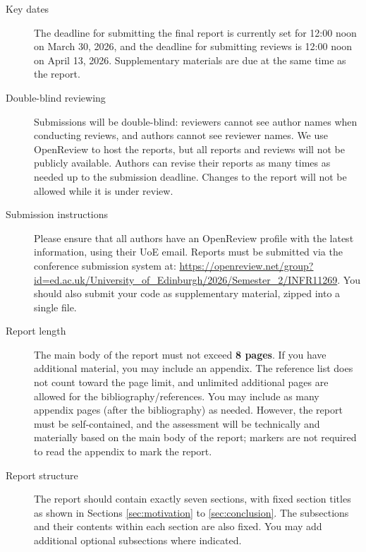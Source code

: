 \documentclass{article} %
\begin{document}
\begin{description}
\item[Key dates] The deadline for submitting the final report is currently set for 12:00 noon on March 30, 2026, and the deadline for submitting reviews is 12:00 noon on April 13, 2026. Supplementary materials are due at the same time as the report.
\item[Double-blind reviewing] Submissions will be double-blind: reviewers cannot see author names when conducting reviews, and authors cannot see reviewer names. We use OpenReview to host the reports, but all reports and reviews will not be publicly available. Authors can revise their reports as many times as needed up to the submission deadline. Changes to the report will not be allowed while it is under review.
\item[Submission instructions] Please ensure that all authors have an OpenReview profile with the latest information, using their UoE email. Reports must be submitted via the conference submission system at: \url{https://openreview.net/group?id=ed.ac.uk/University_of_Edinburgh/2026/Semester_2/INFR11269}. You should also submit your code as supplementary material, zipped into a single file.
\item[Report length] The main body of the report must not exceed {\bf 8
    pages}. If you have additional material, you may include an appendix.
  The reference list does not count toward the page limit, and unlimited additional pages are allowed
  for the bibliography/references.
  You may include as many appendix pages (after the bibliography) as needed. 
  However, the report must be self-contained, and the assessment will be
  technically and materially based on the main body of the report; markers are
  not required to read the appendix to mark the report.
\item[Report structure] The report should contain exactly seven sections, with fixed section titles as shown in Sections \ref{sec:motivation} to \ref{sec:conclusion}. The subsections and their contents within each section are also fixed. You may add additional optional subsections where indicated.
\end{description}
\end{document}
